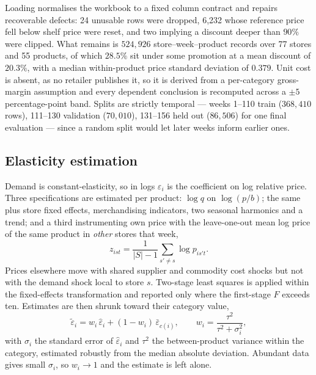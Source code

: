\documentclass[conference,a4paper]{IEEEtran}
\begin{document}
Loading normalises the workbook to a fixed column contract and repairs
recoverable defects: 24 unusable rows were dropped, 6{,}232 whose reference price
fell below shelf price were reset, and two implying a discount deeper than $90\%$
were clipped. What remains is $524{,}926$ store--week--product records over 77
stores and 55 products, of which $28.5\%$ sit under some promotion at a mean
discount of $20.3\%$, with a median within-product price standard deviation of
$0.379$. Unit cost is absent, as no retailer publishes
it, so it is derived from a per-category gross-margin assumption and every
dependent conclusion is recomputed across a $\pm 5$ percentage-point band. Splits
are strictly temporal --- weeks 1--110 train ($368{,}410$ rows), 111--130
validation ($70{,}010$), 131--156 held out ($86{,}506$) for one final evaluation
--- since a random split would let later weeks inform earlier ones.

\subsection{Elasticity estimation}
Demand is constant-elasticity, so in logs $\varepsilon_i$ is the coefficient on
log relative price. Three specifications are estimated per product: $\log q$ on
$\log(p/b)$; the same plus store fixed effects, merchandising indicators, two
seasonal harmonics and a trend; and a third instrumenting own price with the
leave-one-out mean log price of the same product in \emph{other} stores that
week,
\begin{equation}
z_{ist}=\frac{1}{|S|-1}\sum_{s'\neq s}\log p_{is't}.
\label{eq:iv}
\end{equation}
Prices elsewhere move with shared supplier and commodity cost shocks but not with
the demand shock local to store $s$. Two-stage least squares is applied within the
fixed-effects transformation and reported only where the first-stage $F$ exceeds
ten. Estimates are then shrunk toward their category value,
\begin{equation}
\tilde\varepsilon_i = w_i\,\hat\varepsilon_i + (1-w_i)\,\bar\varepsilon_{c(i)},
\qquad
w_i=\frac{\tau^2}{\tau^2+\sigma_i^2},
\label{eq:shrink}
\end{equation}
with $\sigma_i$ the standard error of $\hat\varepsilon_i$ and $\tau^2$ the
between-product variance within the category, estimated robustly from the median
absolute deviation. Abundant data gives small $\sigma_i$, so $w_i\to 1$ and the
estimate is left alone.
\end{document}
